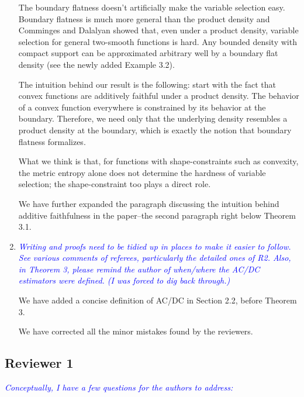 \documentclass[pdftex,12pt]{article}
\def\rc#1{{\it\textcolor{blue}{#1}}\smallskip}
\begin{document}
\begin{enumerate}
The boundary flatness doesn't artificially make the variable selection easy. Boundary flatness is much more general than the product density and Comminges and Dalalyan showed that, even under a product density, variable selection for general two-smooth functions is hard. Any bounded density with compact support can be approximated arbitrary well by a boundary flat density (see the newly added Example 3.2).

The intuition behind our result is the following: start with the fact that convex functions are additively faithful under a product density. The behavior of a convex function everywhere is constrained by its behavior at the boundary. Therefore, we need only that the underlying density resembles a product density at the boundary, which is exactly the notion that boundary flatness formalizes.

What we think is that, for functions with shape-constraints such as convexity, the metric entropy alone does not determine the hardness of variable selection; the shape-constraint too plays a direct role. 

We have further expanded the paragraph discussing the intuition behind additive faithfulness in the paper--the second paragraph right below Theorem 3.1.

\item \rc{Writing and proofs need to be tidied up in places to make it easier
to follow.  See various comments of referees, particularly the
detailed ones of R2.  Also, in Theorem 3, please remind the author of
when/where the AC/DC estimators were defined.  (I was forced to dig
back through.)}

We have added a concise definition of AC/DC in Section 2.2, before Theorem 3. 

We have corrected all the minor mistakes found by the reviewers.

\end{enumerate}

\subsection*{Reviewer 1}

\rc{Conceptually, I have a few questions for the authors to address:}
\end{document}
